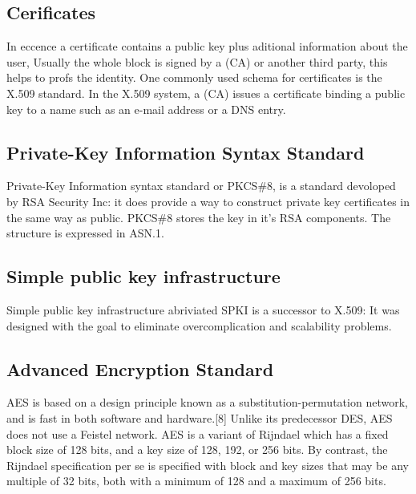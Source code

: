 \subsection{Cerificates} %
In eccence a certificate contains a public key plus aditional information about the user,
Usually the whole block is signed by a (CA) or another third party, this helps to profs the identity. One commonly used schema for certificates is the X.509 standard.
In the X.509 system, a (CA) issues a certificate binding a public key to a name such as an e-mail address or a DNS entry.

\subsection{Private-Key Information Syntax Standard}
Private-Key Information syntax standard or PKCS\#8, is a standard devoloped by RSA Security Inc: it does provide a way to construct private key certificates in the same way as public.
PKCS\#8 stores the key in it's RSA components.
The structure is expressed in ASN.1.
\subsection{Simple public key infrastructure}
Simple public key infrastructure abriviated SPKI is a successor to X.509:
It was designed with the goal to eliminate overcomplication and scalability problems.
\subsection{Advanced Encryption Standard}
AES is based on a design principle known as a substitution-permutation network, and is fast in both software and hardware.[8] Unlike its predecessor DES, AES does not use a Feistel network. AES is a variant of Rijndael which has a fixed block size of 128 bits, and a key size of 128, 192, or 256 bits. By contrast, the Rijndael specification per se is specified with block and key sizes that may be any multiple of 32 bits, both with a minimum of 128 and a maximum of 256 bits.
\cite{AESISFAST:Online}
